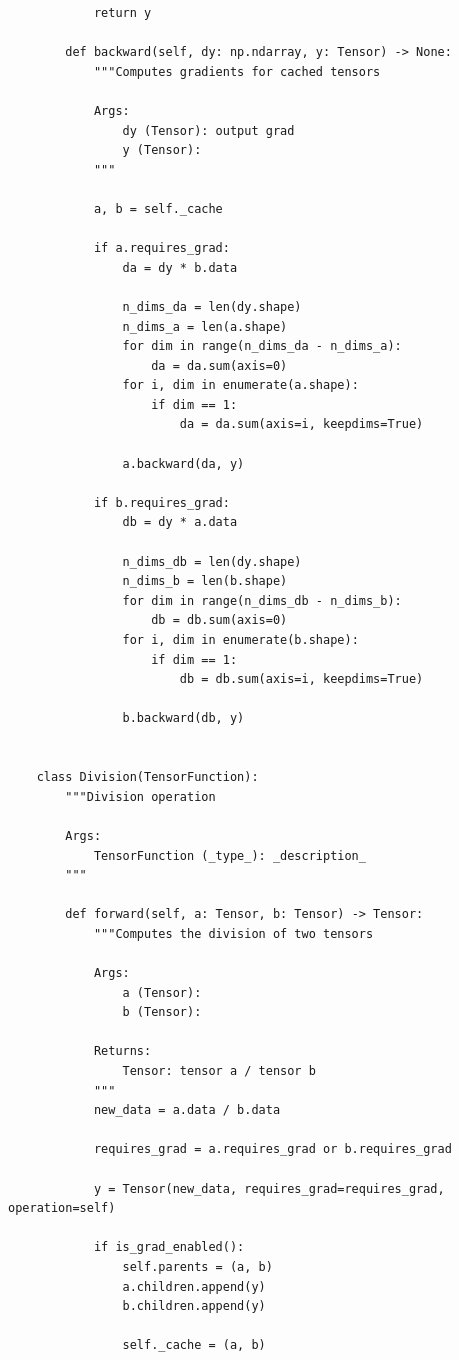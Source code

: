 \documentclass{article}
\begin{document}
\begin{verbatim}
            return y

        def backward(self, dy: np.ndarray, y: Tensor) -> None:
            """Computes gradients for cached tensors

            Args:
                dy (Tensor): output grad
                y (Tensor):
            """

            a, b = self._cache

            if a.requires_grad:
                da = dy * b.data

                n_dims_da = len(dy.shape)
                n_dims_a = len(a.shape)
                for dim in range(n_dims_da - n_dims_a):
                    da = da.sum(axis=0)
                for i, dim in enumerate(a.shape):
                    if dim == 1:
                        da = da.sum(axis=i, keepdims=True)

                a.backward(da, y)

            if b.requires_grad:
                db = dy * a.data

                n_dims_db = len(dy.shape)
                n_dims_b = len(b.shape)
                for dim in range(n_dims_db - n_dims_b):
                    db = db.sum(axis=0)
                for i, dim in enumerate(b.shape):
                    if dim == 1:
                        db = db.sum(axis=i, keepdims=True)

                b.backward(db, y)


    class Division(TensorFunction):
        """Division operation

        Args:
            TensorFunction (_type_): _description_
        """

        def forward(self, a: Tensor, b: Tensor) -> Tensor:
            """Computes the division of two tensors

            Args:
                a (Tensor):
                b (Tensor):

            Returns:
                Tensor: tensor a / tensor b
            """
            new_data = a.data / b.data

            requires_grad = a.requires_grad or b.requires_grad

            y = Tensor(new_data, requires_grad=requires_grad, operation=self)

            if is_grad_enabled():
                self.parents = (a, b)
                a.children.append(y)
                b.children.append(y)

                self._cache = (a, b)


\end{verbatim}
\end{document}

